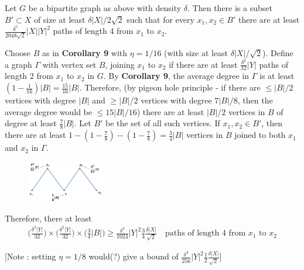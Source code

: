 \documentclass[12pt,a4paper]{report}
\newenvironment{proof}
{\begin{changemargin}{1cm}{0.5cm}
	}%
	{\end{changemargin}
}
\begin{document}
\s

 Let $G$ be a bipartite graph as above with density $\delta$. Then there is a subset $B'\subset X$ of size at least $\delta |X|/2\sqrt{2}$ such that for every $x_1, x_2 \in B'$ there are at least $\frac{\delta^5}{2048 \sqrt{2}} |X| |Y|^2$ paths of length 4 from $x_1$ to $x_2$. 
\begin{proof}
\pf Choose $B$ as in \textbf{Corollary 9} with $\eta = 1/16$ (with size at least $\delta |X|/\sqrt{2}$). Define a graph $\Gamma$ with vertex set $B$, joining $x_1$ to $x_2$ if there are at least $\frac{\delta^2}{32}|Y|$ paths of length 2 from $x_1$ to $x_2$ in $G$. By \textbf{Corollary 9}, the average degree in $\Gamma$ is at least $(1-\frac{1}{16})|B| = \frac{15}{16}|B|$. Therefore, (by pigeon hole principle - if there are $\leq |B|/2$ vertices with degree $|B|$ and $\geq |B|/2$ vertices with degree $7|B|/8$, then the average degree would be $\leq 15|B|/16$) there are at least $|B|/2$ vertices in $B$ of degree at least $\frac{7}{8}|B|$. Let $B'$ be the set of all such vertices. If $x_1,x_2\in B'$, then there are at least $1-(1-\frac{7}{8})-(1-\frac{7}{8})=\frac{3}{4} |B|$ vertices in $B$ joined to both $x_1$ and $x_2$ in $\Gamma$.
\begin{figure}[h]
	\centering
	\includegraphics[width=0.3\textwidth]{1}
\end{figure}
Therefore, there at least
\begin{align*}
\Big(\frac{\delta^2 |Y|}{32}\Big) \times \Big(\frac{\delta^2 |Y|}{32} \Big) \times \Big(\frac{3}{4} |B|\Big) \geq  \frac{\delta^4}{1024} |Y|^2 \frac{3}{4} \frac{\delta |X|}{\sqrt{2}} \quad \text{paths of length 4 from } x_1 \text{ to } x_2
\end{align*} 



[Note : setting $\eta= 1/8$ would(?) give a bound of $\frac{\delta^4}{256} |Y|^2 \frac{1}{2} \frac{\delta |X|}{\sqrt{2}}$]

\eop
\end{proof}
\s
\end{document}
